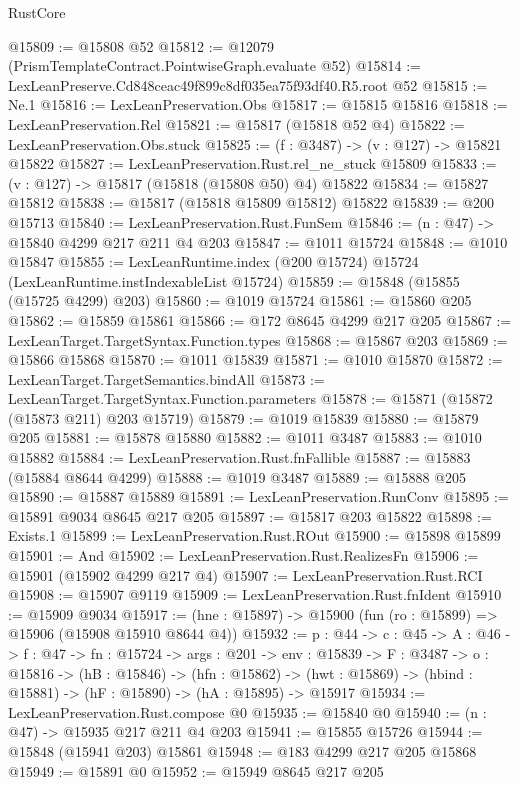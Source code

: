\begin{lexlean}{RustCore}
\begin{coremodule}
@15809 := @15808 @52
@15812 := @12079 (PrismTemplateContract.PointwiseGraph.evaluate @52)
@15814 := LexLeanPreserve.Cd848ceac49f899c8df035ea75f93df40.R5.root @52
@15815 := Ne.{1}
@15816 := LexLeanPreservation.Obs
@15817 := @15815 @15816
@15818 := LexLeanPreservation.Rel
@15821 := @15817 (@15818 @52 @4)
@15822 := LexLeanPreservation.Obs.stuck
@15825 := (f : @3487) -> (v : @127) -> @15821 @15822
@15827 := LexLeanPreservation.Rust.rel_ne_stuck @15809
@15833 := (v : @127) -> @15817 (@15818 (@15808 @50) @4) @15822
@15834 := @15827 @15812
@15838 := @15817 (@15818 @15809 @15812) @15822
@15839 := @200 @15713
@15840 := LexLeanPreservation.Rust.FunSem
@15846 := (n : @47) -> @15840 @4299 @217 @211 @4 @203
@15847 := @1011 @15724
@15848 := @1010 @15847
@15855 := LexLeanRuntime.index (@200 @15724) @15724 (LexLeanRuntime.instIndexableList @15724)
@15859 := @15848 (@15855 (@15725 @4299) @203)
@15860 := @1019 @15724
@15861 := @15860 @205
@15862 := @15859 @15861
@15866 := @172 @8645 @4299 @217 @205
@15867 := LexLeanTarget.TargetSyntax.Function.types
@15868 := @15867 @203
@15869 := @15866 @15868
@15870 := @1011 @15839
@15871 := @1010 @15870
@15872 := LexLeanTarget.TargetSemantics.bindAll
@15873 := LexLeanTarget.TargetSyntax.Function.parameters
@15878 := @15871 (@15872 (@15873 @211) @203 @15719)
@15879 := @1019 @15839
@15880 := @15879 @205
@15881 := @15878 @15880
@15882 := @1011 @3487
@15883 := @1010 @15882
@15884 := LexLeanPreservation.Rust.fnFallible
@15887 := @15883 (@15884 @8644 @4299)
@15888 := @1019 @3487
@15889 := @15888 @205
@15890 := @15887 @15889
@15891 := LexLeanPreservation.RunConv
@15895 := @15891 @9034 @8645 @217 @205
@15897 := @15817 @203 @15822
@15898 := Exists.{1}
@15899 := LexLeanPreservation.Rust.ROut
@15900 := @15898 @15899
@15901 := And
@15902 := LexLeanPreservation.Rust.RealizesFn
@15906 := @15901 (@15902 @4299 @217 @4)
@15907 := LexLeanPreservation.Rust.RCI
@15908 := @15907 @9119
@15909 := LexLeanPreservation.Rust.fnIdent
@15910 := @15909 @9034
@15917 := (hne : @15897) -> @15900 (fun (ro : @15899) => @15906 (@15908 @15910 @8644 @4))
@15932 := {p : @44} ->
  {c : @45} ->
  {A : @46} ->
  {f : @47} ->
  {fn : @15724} ->
  {args : @201} ->
  {env : @15839} ->
  {F : @3487} ->
  {o : @15816} ->
  (hB : @15846) ->
  (hfn : @15862) -> (hwt : @15869) -> (hbind : @15881) -> (hF : @15890) -> (hA : @15895) -> @15917
@15934 := LexLeanPreservation.Rust.compose @0
@15935 := @15840 @0
@15940 := (n : @47) -> @15935 @217 @211 @4 @203
@15941 := @15855 @15726
@15944 := @15848 (@15941 @203) @15861
@15948 := @183 @4299 @217 @205 @15868
@15949 := @15891 @0
@15952 := @15949 @8645 @217 @205

\end{coremodule}
\end{lexlean}
